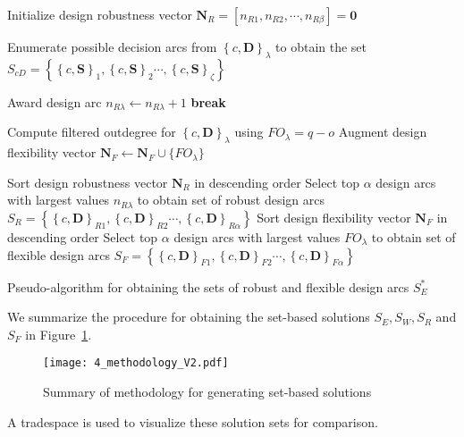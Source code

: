 \begin{algorithm}
	\DontPrintSemicolon %
	Initialize design robustness vector $\mathbf{N}_R = \left[n_{R1},n_{R2},\cdots,n_{R\beta}\right] = \mathbf{0}$\;	
	 {
		Enumerate possible decision arcs from $\left\{c,\mathbf{D}\right\}_\lambda$ to obtain the set $S_{cD} = \left\{\left\{c,\mathbf{S}\right\}_{1},\left\{c,\mathbf{S}\right\}_{2}\cdots,\left\{c,\mathbf{S}\right\}_{\zeta}\right\}$\;
		 {
			 {
				
				 {
					Award design arc $n_{R\lambda} \gets n_{R\lambda} + 1$\;
					\textbf{break}
				}
			
			}
		}
		Compute filtered outdegree for $\left\{c,\mathbf{D}\right\}_\lambda$ using $FO_{\lambda} = q - o$\;
		Augment design flexibility vector $\mathbf{N}_F \gets \mathbf{N}_F \cup \{ FO_{\lambda} \} $\;
	}
	Sort design robustness vector $\mathbf{N}_R$ in descending order\;
	Select top $\alpha$ design arcs with largest values $n_{R\lambda}$ to obtain set of robust design arcs $S_R = \left\{\left\{c,\mathbf{D}\right\}_{R1},\left\{c,\mathbf{D}\right\}_{R2}\cdots,\left\{c,\mathbf{D}\right\}_{R\alpha}\right\}$\;
	Sort design flexibility vector $\mathbf{N}_F$ in descending order\;
	Select top $\alpha$ design arcs with largest values $FO_{\lambda}$ to obtain set of flexible design arcs $S_F = \left\{\left\{c,\mathbf{D}\right\}_{F1},\left\{c,\mathbf{D}\right\}_{F2}\cdots,\left\{c,\mathbf{D}\right\}_{F\alpha}\right\}$\;
	\caption{Pseudo-algorithm for obtaining the sets of robust and flexible design arcs $S_{E}^*$}
	\label{algo:SBDRobustalgo}
\end{algorithm}

We summarize the procedure for obtaining the set-based solutions $S_E,S_W,S_R$ and $S_F$ in Figure~\ref{fig:methodology}.

\begin{figure}[h!]
	\centering
	\texttt{[image: 4\_methodology\_V2.pdf]}
	\caption{Summary of methodology for generating set-based solutions}
	\label{fig:methodology}
\end{figure}

A tradespace is used to visualize these solution sets for comparison.

